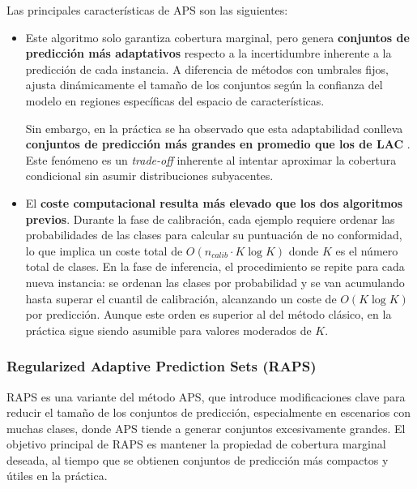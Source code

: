 Las principales características de APS son las siguientes:

\begin{itemize}
    \item Este algoritmo solo garantiza cobertura marginal, pero genera \textbf{conjuntos de predicción más adaptativos} respecto a la incertidumbre inherente a la predicción de cada instancia. A diferencia de métodos con umbrales fijos, ajusta dinámicamente el tamaño de los conjuntos según la confianza del modelo en regiones específicas del espacio de características.
    
    Sin embargo, en la práctica se ha observado que esta adaptabilidad conlleva \textbf{conjuntos de predicción más grandes en promedio que los de LAC} \cite{romano2020, angelopoulos2020}. Este fenómeno es un \textit{trade-off} inherente al intentar aproximar la cobertura condicional sin asumir distribuciones subyacentes.
    
    \item El \textbf{coste computacional resulta más elevado que los dos algoritmos previos}. Durante la fase de calibración, cada ejemplo requiere ordenar las probabilidades de las clases para calcular su puntuación de no conformidad, lo que implica un coste total de $O(n_{calib} \cdot K \log K)$ donde $K$ es el número total de clases. En la fase de inferencia, el procedimiento se repite para cada nueva instancia: se ordenan las clases por probabilidad y se van acumulando hasta superar el cuantil de calibración, alcanzando un coste de $O(K \log K)$ por predicción. Aunque este orden es superior al del método clásico, en la práctica sigue siendo asumible para valores moderados de $K$.
    
\end{itemize}


\subsubsection{Regularized Adaptive Prediction Sets (RAPS)}

\acrshort{RAPS} \cite{angelopoulos2020} es una variante del método APS, que introduce modificaciones clave para reducir el tamaño de los conjuntos de predicción, especialmente en escenarios con muchas clases, donde \acrshort{APS} tiende a generar conjuntos excesivamente grandes. El objetivo principal de \acrshort{RAPS} es mantener la propiedad de cobertura marginal deseada, al tiempo que se obtienen conjuntos de predicción más compactos y útiles en la práctica. 

